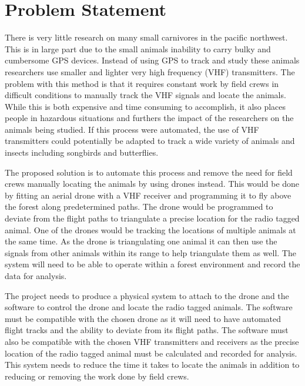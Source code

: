 \documentclass[onecolumn, draftclsnofoot,10pt, compsoc]{IEEEtran}
\begin{document}
\newpage
{}
\tableofcontents
\clearpage

\section{Problem Statement}

	There is very little research on many small carnivores in the pacific northwest. This is in large part due to the small animals inability to carry bulky and cumbersome GPS devices. Instead of using GPS to track and study these animals researchers use smaller and lighter very high frequency (VHF) transmitters. The problem with this method is that it requires constant work by field crews in difficult conditions to manually track the VHF signals and locate the animals. While this is both expensive and time consuming to accomplish, it also places people in hazardous situations and furthers the impact of the researchers on the animals being studied. If this process were automated, the use of VHF transmitters could potentially be adapted to track a wide variety of animals and insects including songbirds and butterflies.\par
    \vspace{5pt}
    The proposed solution is to automate this process and remove the need for field crews manually locating the animals by using drones instead. This would be done by fitting an aerial drone with a VHF receiver and programming it to fly above the forest along predetermined paths. The drone would be programmed to deviate from the flight paths to triangulate a precise location for the radio tagged animal. One of the drones would be tracking the locations of multiple animals at the same time. As the drone is triangulating one animal it can then use the signals from other animals within its range to help triangulate them as well. The system will need to be able to operate within a forest environment and record the data for analysis.\par
    \vspace{5pt}
    The project needs to produce a physical system to attach to the drone and the software to control the drone and locate the radio tagged animals. The software must be compatible with the chosen drone as it will need to have automated flight tracks and the ability to deviate from its flight paths. The software must also be compatible with the chosen VHF transmitters and receivers as the precise location of the radio tagged animal must be calculated and recorded for analysis. This system needs to reduce the time it takes to locate the animals in addition to reducing or removing the work done by field crews.\par
\end{document}
